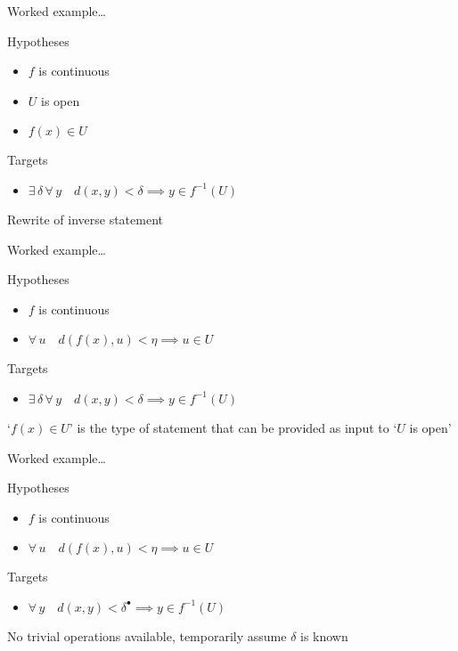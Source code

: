 \begin{frame}{Worked example\ldots}
  \begin{block}{Hypotheses}
    \begin{itemize}
      \item $f$ is continuous
      \item $U$ is open
      \item $f(x) \in U$
    \end{itemize}
  \end{block}
  \begin{block}{Targets}
    \begin{itemize}
      \item $\exists\,\delta\,\forall\,y\quad d(x, y) < \delta \implies y \in f^{-1}(U)$
    \end{itemize}
  \end{block}
  \begin{block}{}
    Rewrite of inverse statement
  \end{block}
\end{frame}

\begin{frame}{Worked example\ldots}
  \begin{block}{Hypotheses}
    \begin{itemize}
      \item $f$ is continuous
      \item $\forall\,u\quad d(f(x), u) < \eta \implies u \in U$
    \end{itemize}
  \end{block}
  \begin{block}{Targets}
    \begin{itemize}
      \item $\exists\,\delta\,\forall\,y\quad d(x, y) < \delta \implies y \in f^{-1}(U)$
    \end{itemize}
  \end{block}
  \begin{block}{}
    `$f(x) \in U$' is the type of statement that can be provided as input to `$U$ is open'
  \end{block}
\end{frame}

\begin{frame}{Worked example\ldots}
  \begin{block}{Hypotheses}
    \begin{itemize}
      \item $f$ is continuous
      \item $\forall\,u\quad d(f(x), u) < \eta \implies u \in U$
    \end{itemize}
  \end{block}
  \begin{block}{Targets}
    \begin{itemize}
      \item $\forall\,y\quad d(x, y) < \delta^\bullet \implies y \in f^{-1}(U)$
    \end{itemize}
  \end{block}
  \begin{block}{}
    No trivial operations available, temporarily assume $\delta$ is known
  \end{block}
\end{frame}

